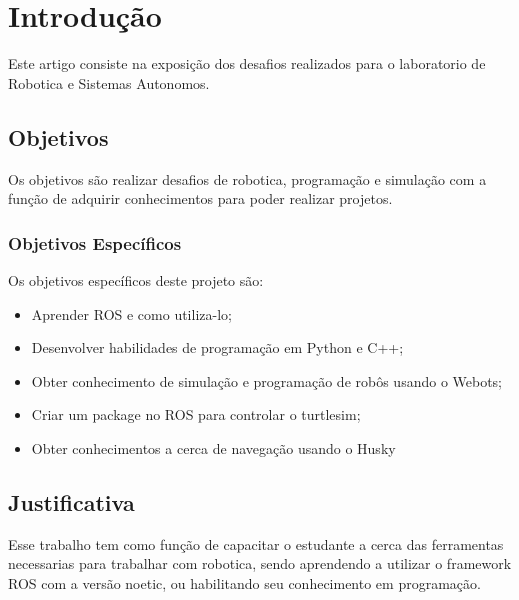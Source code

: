 \chapter{Introdução}
\label{chap:intro}

Este artigo consiste na exposição dos desafios realizados para o 
laboratorio de Robotica e Sistemas Autonomos.

\section{Objetivos}
\label{sec:obj}
Os objetivos são realizar desafios de robotica, programação 
e simulação com a função de adquirir conhecimentos para poder realizar 
projetos.
\label{sec:obj}

\subsection{Objetivos Específicos}
\label{ssec:objesp}
Os objetivos específicos deste projeto são:
\begin{itemize}
      \item Aprender ROS e como utiliza-lo;
      \item Desenvolver habilidades de programação em Python e C++;
      \item Obter conhecimento de simulação e programação de robôs usando o Webots;
      \item Criar um package no ROS para controlar o turtlesim;
      \item Obter conhecimentos a cerca de navegação usando o Husky
  \end{itemize}



\section{Justificativa}
\label{sec:justi}

Esse trabalho tem como função de capacitar o estudante a cerca das 
ferramentas necessarias para trabalhar com robotica, sendo aprendendo 
a utilizar o framework ROS com a versão noetic, ou habilitando seu
conhecimento em programação.


